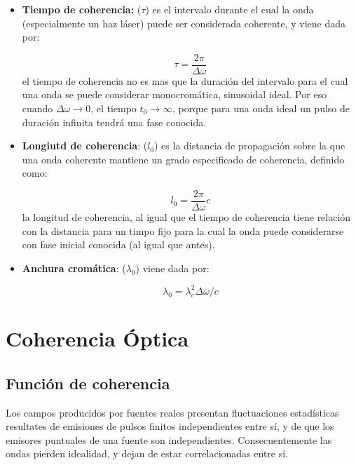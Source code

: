 \documentclass[12pt,a4paper]{book}
\numberwithin{equation}{section}
\numberwithin{figure}{section}
\newcommand{\1}{_{(1)}}
\newcommand{\2}{_{(2)}}
\theoremstyle{definition}
\begin{document}
\begin{itemize}
\item \textbf{Tiempo de coherencia:} ($\tau$) es el intervalo durante el cual la onda (especialmente un haz láser) puede ser considerada coherente, y viene dada por:

\begin{equation}
\tau = \dfrac{2 \pi}{\Delta \omega}
\end{equation}
el tiempo de coherencia no es mas que la duración del intervalo para el cual una onda se puede considerar monocromática, sinusoidal ideal. Por eso cuando $\Delta \omega \rightarrow 0$, el tiempo $t_0 \rightarrow \infty$, porque para una onda ideal un pulso de duración infinita tendrá una fase conocida. 

\item \textbf{Longiutd de coherencia}: ($l_0$) es la distancia de propagación sobre la que una onda coherente mantiene un grado especificado de coherencia, definido como:

\begin{equation}
l_0 = \dfrac{2 \pi}{\Delta \omega} c 
\end{equation}
la longitud de coherencia, al igual que el tiempo de coherencia tiene relación con la distancia para un timpo fijo para la cual la onda puede considerarse con fase inicial conocida (al igual que antes).

\item \textbf{Anchura cromática}: ($\lambda_0$) viene dada por:

\begin{equation}
\lambda_0 = \lambda_c^2 \Delta \omega / c
\end{equation}
\end{itemize}

\section{Coherencia Óptica}

\subsection{Función de coherencia}

Los campos producidos por fuentes reales presentan fluctuaciones estadísticas resultates de emisiones de pulsos finitos independientes entre sí, y de que los emisores puntuales de una fuente son independientes. Consecuentemente las ondas pierden idealidad, y dejan de estar correlacionadas entre sí. \\
\end{document}
